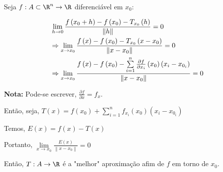 \documentclass{book}
\begin{document}
\begin{defn}
Seja $f:A \subset \R^n \to \R$ diferenci\'avel em $x_0$:

\[
\begin{gathered}
  \mathop {\lim }\limits_{h \to 0} \frac{{f\left( {x_0  + h} \right) - f\left( {x_0 } \right) - T_{x_0 } \left( h \right)}}
{{\left\| h \right\|}} = 0 \hfill \\
   \Rightarrow \mathop {\lim }\limits_{x \to x_0 } \frac{{f\left( x \right) - f\left( {x_0 } \right) - T_{x_0 } \left( {x - x_0 } \right)}}
{{\left\| {x - x_0 } \right\|}} = 0 \hfill \\
   \Rightarrow \mathop {\lim }\limits_{x \to x_0 } \frac{{f\left( x \right) - f\left( {x_0 } \right) - \sum\limits_{i = 1}^n {\frac{{\partial f}}
{{\partial x_i }}\left( {x_0 } \right)\left( {x_i  - x_{0_i } } \right)} }}
{{\left\| {x - x_0 } \right\|}} = 0 \hfill \\
\end{gathered}
\]

\textbf{Nota:} Pode-se escrever, $\frac{{\partial f}}{{\partial x}} = f_x$.

    Ent\~ao, seja, $T\left( x \right) = f\left( {x_0 } \right) + \sum\limits_{i = 1}^n {f_{x_i } \left( {x_0 } \right)\left( {x_i  - x_{0_i } } \right)}$

Temos,  $E\left( x \right) = f\left( x \right) - T\left( x \right)$

    Portanto, $\displaystyle \mathop {\lim }\limits_{x \to x_0 } \frac{{E\left( x \right)}}{{\left\| {x - x_0 } \right\|}} = 0$

    Ent\~ao, $T:A \to \R$ \'e a "melhor" aproxima\c c\~ao afim de $f$ em torno de $x_0$.
\end{defn}
\end{document}
